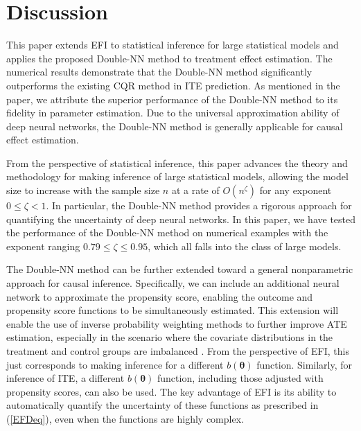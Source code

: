 \documentclass[11pt]{article}
\newcommand{\btheta}{{\boldsymbol \theta}}
\begin{document}
\section{Discussion}  \label{discsection}

 This paper extends EFI to statistical inference for large statistical  models and applies the proposed Double-NN method to treatment effect estimation. The numerical results demonstrate that the Double-NN method significantly outperforms the existing CQR method in ITE prediction. As mentioned in the paper, we attribute the superior performance of the Double-NN method to its fidelity in parameter estimation. Due to the universal approximation ability of deep neural networks, the Double-NN method is generally applicable for causal effect estimation. 
 
 From the perspective of statistical inference, this paper advances the theory and methodology for making inference of large statistical models, allowing the model size to increase with the sample size $n$ at a rate of $O(n^{\zeta})$ for any exponent $0 \leq \zeta<1$. 
 In particular, the Double-NN method provides a rigorous approach for quantifying the uncertainty of deep neural networks. In this paper, we have tested the performance of the Double-NN method on numerical examples with the exponent ranging $0.79 \leq \zeta \leq 0.95$, which all falls into the class of large models. 


The Double-NN method can be further extended toward a general 
nonparametric approach for causal inference. Specifically, we can include an additional neural network to approximate the propensity score, enabling the outcome and propensity score functions 
to be simultaneously estimated.  
  This extension will enable the use of inverse probability weighting methods to further improve ATE estimation, especially in the scenario where the 
  covariate distributions in the treatment and control groups 
  are imbalanced \citep{shalit2017pehe,hahn2020nonpar3}. 
  From the perspective of EFI, this just corresponds to making inference 
  for a different $b(\btheta)$ function.  
  Similarly, for inference of ITE, a different $b(\btheta)$ function, including those adjusted with propensity scores, can also be used.
 The key advantage of EFI is its ability to automatically quantify the uncertainty of these functions as prescribed in (\ref{EFDeq}), even when the functions are highly complex.
  
\end{document}
